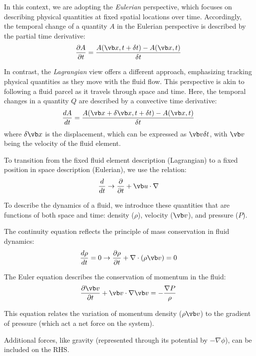 In this context, we are adopting the \emph{Eulerian} perspective, which focuses on describing physical quantities at fixed spatial locations  over time. 
%
Accordingly, the temporal change of a quantity \(A\) in the Eulerian perspective is described by the partial time derivative:
%
\[
\frac{\partial A}{\partial t} = \frac{A(\vb x, t +\delta t) - A(\vb x, t)}{\delta t} 
\]

In contrast, the \emph{Lagrangian} view offers a different approach, emphasizing tracking physical quantities as they move with the fluid flow. This perspective is akin to following a fluid parcel as it travels through space and time. Here, the temporal changes in a quantity \(Q\) are described by a convective time derivative:
%
\[
\frac{d A}{dt} = \frac{A(\vb x + \delta \vb x, t + \delta t) - A(\vb x, t)}{\delta t} 
\]
%
where \( \delta \vb x \) is the displacement, which can be expressed as \( \vb v \delta t \), with \( \vb v \) being the velocity of the fluid element.

To transition from the fixed fluid element description (Lagrangian) to a fixed position in space description (Eulerian), we use the relation:
%
\begin{equation}
\frac{d}{dt} \rightarrow \frac{\partial}{\partial t} + \vb u \cdot \nabla
\end{equation}

To describe the dynamics of a fluid, we introduce these quantities that are functions of both space and time: density (\( \rho \)), velocity (\( \vb v \)), and pressure (\( P \)).

The continuity equation reflects the principle of mass conservation in fluid dynamics:
%
\begin{equation}
\frac{d\rho}{dt}  = 0 \rightarrow \frac{\partial \rho}{\partial t} + \nabla \cdot (\rho \vb v) = 0
\end{equation}

The Euler equation describes the conservation of momentum in the fluid:
%
\begin{equation}
\frac{\partial \vb v}{\partial t} + \vb v \cdot \nabla \vb v = - \frac{\nabla P}{\rho}
\end{equation}

This equation relates the variation of momentum density (\( \rho \vb v \)) to the gradient of pressure (which act a net force on the system).

Additional forces, like gravity (represented through its potential by \( - \nabla \phi \)), can be included on the RHS.

